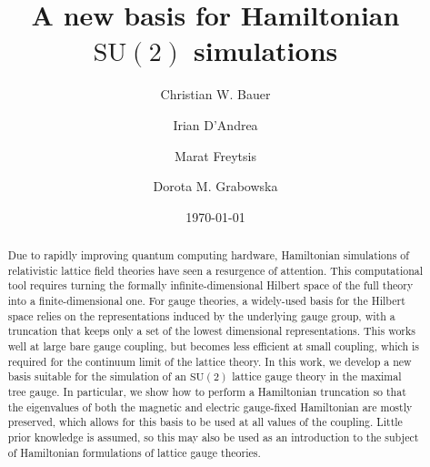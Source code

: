 \documentclass[reprint,superscriptaddress,pra,nofootinbib,preprintnumbers,floatfix]{revtex4-1}
\providecommand{\sutwo}{$\mathrm{SU}(2)$\xspace}
\begin{document}
\title{\boldmath A new basis for Hamiltonian \texorpdfstring{\sutwo}{SU(2)} simulations}

\author{Christian W. Bauer}

\author{Irian D'Andrea}

\author{Marat Freytsis}

\author{Dorota M. Grabowska}


\date{\today}

\begin{abstract}
Due to rapidly improving quantum computing hardware, Hamiltonian simulations of relativistic lattice field theories have seen a resurgence of attention. 
%
This computational tool requires turning the formally infinite-dimensional Hilbert space of the full theory into a finite-dimensional one. 
%
For gauge theories, a widely-used basis for the Hilbert space relies on the representations induced by the underlying gauge group, with a truncation that keeps only a set of the lowest dimensional representations. 
%
This works well at large bare gauge coupling, but becomes less efficient at small coupling, which is required for the continuum limit of the lattice theory.  
%
In this work, we develop a new basis suitable for the simulation of an \sutwo lattice gauge theory in the maximal tree gauge. 
%
In particular, we show how to perform a Hamiltonian truncation so that the eigenvalues of both the magnetic and electric gauge-fixed Hamiltonian are mostly preserved, which allows for this basis to be used at all values of the coupling. 
%
Little prior knowledge is assumed, so this may also be used as an introduction to the subject of Hamiltonian formulations of lattice gauge theories.


\end{abstract}

\maketitle
\end{document}
